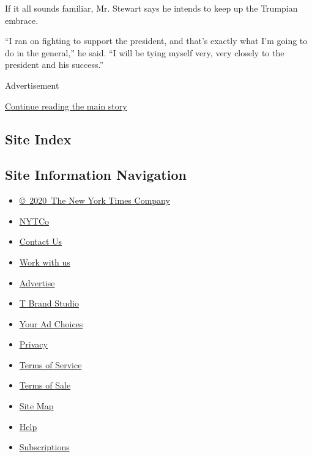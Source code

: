 If it all sounds familiar, Mr. Stewart says he intends to keep up the
Trumpian embrace.

``I ran on fighting to support the president, and that's exactly what
I'm going to do in the general,'' he said. ``I will be tying myself
very, very closely to the president and his success.''

Advertisement

\protect\hyperlink{after-bottom}{Continue reading the main story}

\hypertarget{site-index}{%
\subsection{Site Index}\label{site-index}}

\hypertarget{site-information-navigation}{%
\subsection{Site Information
Navigation}\label{site-information-navigation}}

\begin{itemize}
\tightlist
\item
  \href{https://help.nytimes3xbfgragh.onion/hc/en-us/articles/115014792127-Copyright-notice}{©~2020~The
  New York Times Company}
\end{itemize}

\begin{itemize}
\tightlist
\item
  \href{https://www.nytco.com/}{NYTCo}
\item
  \href{https://help.nytimes3xbfgragh.onion/hc/en-us/articles/115015385887-Contact-Us}{Contact
  Us}
\item
  \href{https://www.nytco.com/careers/}{Work with us}
\item
  \href{https://nytmediakit.com/}{Advertise}
\item
  \href{http://www.tbrandstudio.com/}{T Brand Studio}
\item
  \href{https://www.nytimes3xbfgragh.onion/privacy/cookie-policy\#how-do-i-manage-trackers}{Your
  Ad Choices}
\item
  \href{https://www.nytimes3xbfgragh.onion/privacy}{Privacy}
\item
  \href{https://help.nytimes3xbfgragh.onion/hc/en-us/articles/115014893428-Terms-of-service}{Terms
  of Service}
\item
  \href{https://help.nytimes3xbfgragh.onion/hc/en-us/articles/115014893968-Terms-of-sale}{Terms
  of Sale}
\item
  \href{https://spiderbites.nytimes3xbfgragh.onion}{Site Map}
\item
  \href{https://help.nytimes3xbfgragh.onion/hc/en-us}{Help}
\item
  \href{https://www.nytimes3xbfgragh.onion/subscription?campaignId=37WXW}{Subscriptions}
\end{itemize}

